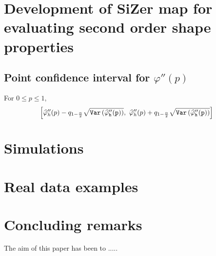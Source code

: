 \documentclass[preprint,12pt]{elsarticle}
\begin{document}
\section{Development of SiZer map for evaluating second order shape properties}

\subsection*{Point confidence interval for $\varphi''(p)$}
For $0\leq p \leq 1$,
\[
\left[\widehat{\varphi}''_h(p)-q_{1-\frac{\alpha}{2}}\sqrt{\tt{Var}\left(\widehat{\varphi}''_h(p)\right)}, \ \widehat{\varphi}''_h(p)+q_{1-\frac{\alpha}{2}}\sqrt{\tt{Var}\left(\widehat{\varphi}''_h(p)\right)}\right]
\]


\newpage
\section{Simulations}

\section{Real data examples}

\section{Concluding remarks}

The aim of this paper has been to .....
\newpage
\begin{thebibliography}{}
\end{thebibliography}
\end{document}
